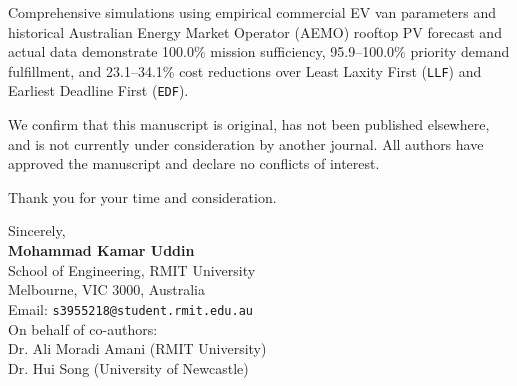 \documentclass[11pt]{article}
\begin{document}
Comprehensive simulations using empirical commercial EV van parameters and historical Australian Energy Market Operator (AEMO) rooftop PV forecast and actual data demonstrate 100.0\% mission sufficiency, 95.9--100.0\% priority demand fulfillment, and 23.1--34.1\% cost reductions over Least Laxity First (\texttt{LLF}) and Earliest Deadline First (\texttt{EDF}).

We confirm that this manuscript is original, has not been published elsewhere, and is not currently under consideration by another journal. All authors have approved the manuscript and declare no conflicts of interest.

Thank you for your time and consideration.

\vspace{1.5em}
\noindent Sincerely, \\[1em]
\textbf{Mohammad Kamar Uddin} \\
School of Engineering, RMIT University \\
Melbourne, VIC 3000, Australia \\
Email: \texttt{s3955218@student.rmit.edu.au} \\[0.5em]
On behalf of co-authors: \\
Dr. Ali Moradi Amani (RMIT University) \\
Dr. Hui Song (University of Newcastle)
\end{document}
